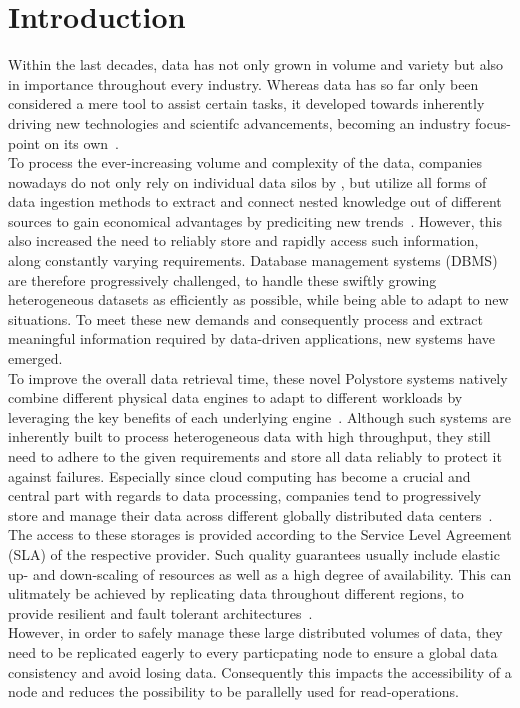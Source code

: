 \chapter{Introduction}
\label{c:intro}

Within the last decades, data has not only grown in volume and variety but also in importance throughout every industry. 
Whereas data has so far only been considered a mere tool to assist certain tasks, it developed towards inherently
driving new technologies and scientifc advancements, becoming an industry focus-point on its own~\cite{data-driven_2014}.\\
To process the ever-increasing volume and complexity of the data, companies nowadays do not only rely on individual data silos by , but utilize 
all forms of data ingestion methods to extract and connect nested knowledge out of different sources 
to gain economical advantages by prediciting new trends~\cite{ingestion_2016}.
However, this also increased the need to reliably store and rapidly access such information, along constantly varying requirements.
Database management systems (DBMS) are therefore progressively challenged, to handle these swiftly growing heterogeneous datasets as efficiently as possible,
while being able to adapt to new situations. 
To meet these new demands and consequently process and extract meaningful information required by data-driven applications, new systems have emerged.\\
To improve the overall data retrieval time, these novel Polystore systems natively combine different physical data engines to 
adapt to different workloads by leveraging the key benefits of each underlying engine~\cite{stonebraker:2005, polypheny2020}. 
Although such systems are inherently built to process heterogeneous data with high throughput, they still need to adhere to the given requirements
and store all data reliably to protect it against failures.  
Especially since cloud computing has become a crucial and central part with regards to data processing, 
companies tend to progressively store and manage their data across different globally distributed data centers~\cite{claremont:2005}. 
The access to these storages is provided according to the Service Level Agreement (SLA) of the respective provider.
Such quality guarantees usually include elastic up- and down-scaling of resources as well as a high degree of availability.
This can ulitmately be achieved by replicating data throughout different regions, to provide resilient and fault tolerant architectures~\cite{brinkmann:2015, terry:2013}.\\
However, in order to safely manage these large distributed volumes of data, they need to be replicated eagerly to 
every particpating node to ensure a global data consistency and avoid losing data. 
Consequently this impacts the accessibility of a node and reduces the possibility to be parallelly used for read-operations.

